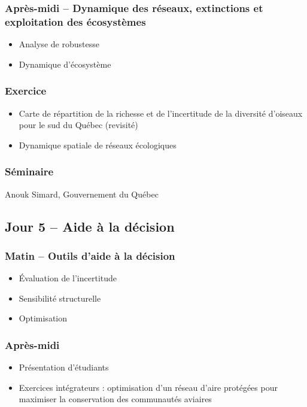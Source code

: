 \documentclass[12]{article}
\begin{document}
  \subsubsection*{Après-midi -- Dynamique des réseaux, extinctions et exploitation des écosystèmes}
  \begin{itemize}
    \item Analyse de robustesse
    \item Dynamique d'écosystème
  \end{itemize}
  \subsubsection*{Exercice}
  \begin{itemize}
    \item Carte de répartition de la richesse et de l'incertitude de la diversité d'oiseaux pour le sud du Québec (revisité)
    \item Dynamique spatiale de réseaux écologiques
  \end{itemize}

  \subsubsection*{Séminaire}
  Anouk Simard, Gouvernement du Québec

  \subsection*{Jour 5 -- Aide à la décision}
  \subsubsection*{Matin -- Outils d'aide à la décision}
  \begin{itemize}
    \item Évaluation de l'incertitude
    \item Sensibilité structurelle
    \item Optimisation
  \end{itemize}
  \subsubsection*{Après-midi}
  \begin{itemize}
    \item Présentation d'étudiants
    \item Exercices intégrateurs : optimisation d'un réseau d'aire protégées pour maximiser la conservation des communautés aviaires
  \end{itemize}
\end{document}
